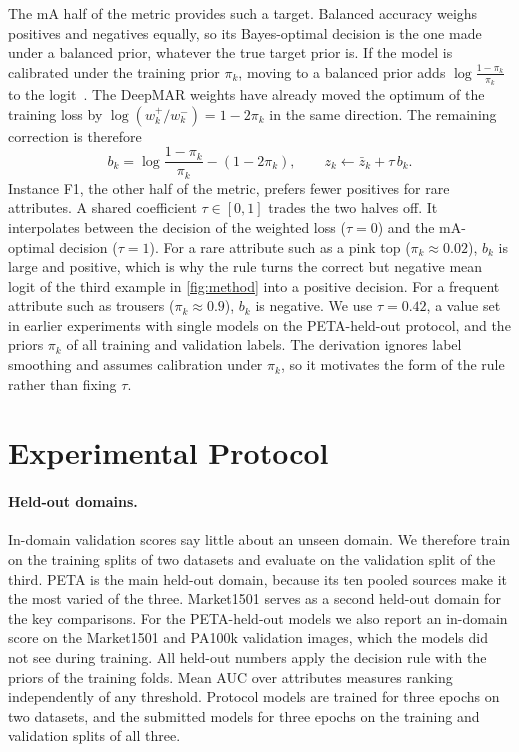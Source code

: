 \documentclass[10pt,twocolumn,letterpaper]{article}
\begin{document}
The mA half of the metric provides such a target. Balanced accuracy weighs positives and negatives equally, so its Bayes-optimal decision is the one made under a balanced prior, whatever the true target prior is. If the model is calibrated under the training prior $\pi_k$, moving to a balanced prior adds $\log\frac{1-\pi_k}{\pi_k}$ to the logit~\cite{saerens,logitadj}. The DeepMAR weights have already moved the optimum of the training loss by $\log(w_k^{+}/w_k^{-})=1-2\pi_k$ in the same direction. The remaining correction is therefore
\begin{equation}
b_k=\log\frac{1-\pi_k}{\pi_k}-(1-2\pi_k),\qquad z_k \leftarrow \bar z_k+\tau\,b_k .
\label{eq:rule}
\end{equation}
Instance F1, the other half of the metric, prefers fewer positives for rare attributes. A shared coefficient $\tau\in[0,1]$ trades the two halves off. It interpolates between the decision of the weighted loss ($\tau=0$) and the mA-optimal decision ($\tau=1$). For a rare attribute such as a pink top ($\pi_k\approx0.02$), $b_k$ is large and positive, which is why the rule turns the correct but negative mean logit of the third example in \cref{fig:method} into a positive decision. For a frequent attribute such as trousers ($\pi_k\approx0.9$), $b_k$ is negative. We use $\tau=0.42$, a value set in earlier experiments with single models on the PETA-held-out protocol, and the priors $\pi_k$ of all training and validation labels. The derivation ignores label smoothing and assumes calibration under $\pi_k$, so it motivates the form of the rule rather than fixing $\tau$.

\section{Experimental Protocol}
\label{sec:protocol}

\paragraph{Held-out domains.} In-domain validation scores say little about an unseen domain. We therefore train on the training splits of two datasets and evaluate on the validation split of the third. PETA is the main held-out domain, because its ten pooled sources make it the most varied of the three. Market1501 serves as a second held-out domain for the key comparisons. For the PETA-held-out models we also report an in-domain score on the Market1501 and PA100k validation images, which the models did not see during training. All held-out numbers apply the decision rule with the priors of the training folds. Mean AUC over attributes measures ranking independently of any threshold. Protocol models are trained for three epochs on two datasets, and the submitted models for three epochs on the training and validation splits of all three.
\end{document}
